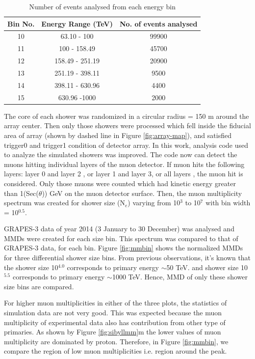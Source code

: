 \documentclass[12pt]{article}
\begin{document}
\begin{table}[h]
\centering
\begin{tabular}{ | c | c | c |} 
\hline
Bin No. & Energy Range (TeV) & No. of events analysed  \\ 
\hline
10 & 63.10 - 100 & 99900  \\ 
\hline
11 & 100 - 158.49 & 45700  \\
\hline
12 & 158.49 - 251.19 & 20900 \\
\hline
13 & 251.19 - 398.11 & 9500 \\
\hline
14 & 398.11 - 630.96 & 4400 \\
\hline
15 & 630.96 -1000 & 2000 \\
\hline
\end{tabular}
\caption{Number of events analysed from each energy bin}
\label{tab:binning}
\end{table}

The core of each shower was randomized in a circular radius  = 150 m around the array center. Then only those showers were processed which fell inside the fiducial area of array (shown by dashed line in Figure \ref{fig:array-map}), and satisfied trigger0 and trigger1 condition of detector array\cite{gupta}. In this work, analysis code used to analyze the simulated showers was improved. The code now can detect the muons hitting individual layers of the muon detector. If muon hits the following layers: layer 0 and layer 2 , or layer 1 and layer 3, or all layers , the muon hit is considered. Only those muons were counted which had kinetic energy greater than 1(Sec($\theta$)) GeV on the muon detector surface. Then, the muon multiplicity spectrum was created for shower size (N$_e$) varying from 10$^3$ to 10$^7$ with bin width = 10$^{0.5}$. 

GRAPES-3 data of year 2014 (3 January to 30 December) was analysed and MMDs were created for each size bin. This spectrum was compared to that of GRAPES-3 data, for each bin. Figure \ref{fig:mmbin} shows the normalized MMDs for three differential shower size bins. From previous observations, it's known that the shower size 10$^{4.0}$ corresponds to  primary energy $\sim$50 TeV. and shower size 10$^{5.5}$ corresponds to primary energy $\sim$1000 TeV. Hence, MMD of only these shower size bins are compared. 

For higher muon multiplicities in either of the three plots, the statistics of simulation data are not very good. This was expected because the muon multiplicity of experimental data also has contribution from other type of primaries. As shown by Figure \ref{fig:sibyllmm}m the lower values of muon multiplicity are dominated by proton. Therefore, in Figure \ref{fig:mmbin}, we compare the region of low muon multiplicities i.e. region around the peak. 
\end{document}
